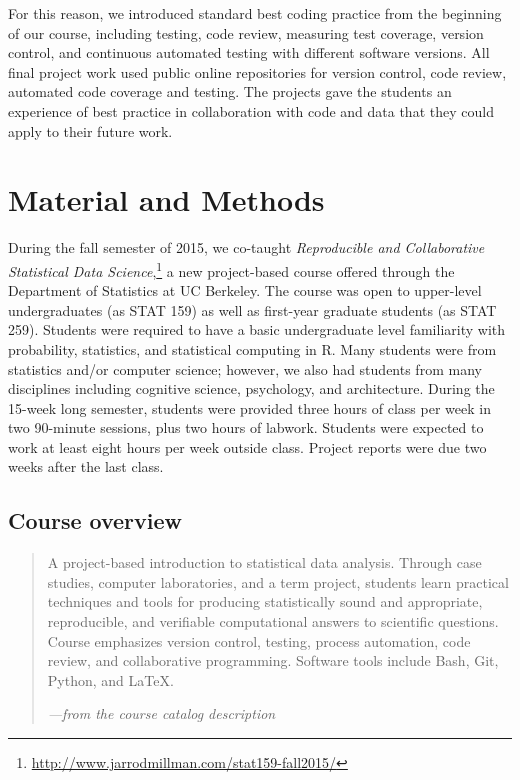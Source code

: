 For this reason, we introduced standard best coding practice from the
beginning of our course, including testing, code review, measuring test
coverage, version control, and continuous automated testing with different
software versions. All final project work used public online repositories for
version control, code review, automated code coverage and testing.  The
projects gave the students an experience of best practice in collaboration
with code and data that they could apply to their future work.


\section{Material and Methods}\label{methods}

During the fall semester of 2015, we co-taught \emph{Reproducible and Collaborative
Statistical Data Science},\footnote{\url{http://www.jarrodmillman.com/stat159-fall2015/}}
a new project-based course offered through the Department of Statistics at UC Berkeley.
The course was open to upper-level undergraduates (as STAT 159) as well as
first-year graduate students (as STAT 259).
Students were required to have a basic undergraduate level familiarity with
probability, statistics, and statistical computing in R.
Many students were from statistics and/or computer science; however, we also
had students from many disciplines including cognitive science, psychology, and
architecture.
During the 15-week long semester, students were provided three hours of class
per week in two 90-minute sessions, plus two hours of labwork.
Students were expected to work at least eight hours per week outside class.
Project reports were due two weeks after the last class.

\subsection{Course overview}

\begin{quote}
A project-based introduction to statistical data analysis. Through case
studies, computer laboratories, and a term project, students learn
practical techniques and tools for producing statistically sound and
appropriate, reproducible, and verifiable computational answers to
scientific questions. Course emphasizes version control, testing,
process automation, code review, and collaborative programming.
Software tools include Bash, Git, Python, and \LaTeX.

\hfill\emph{---from the course catalog description}
\end{quote}

